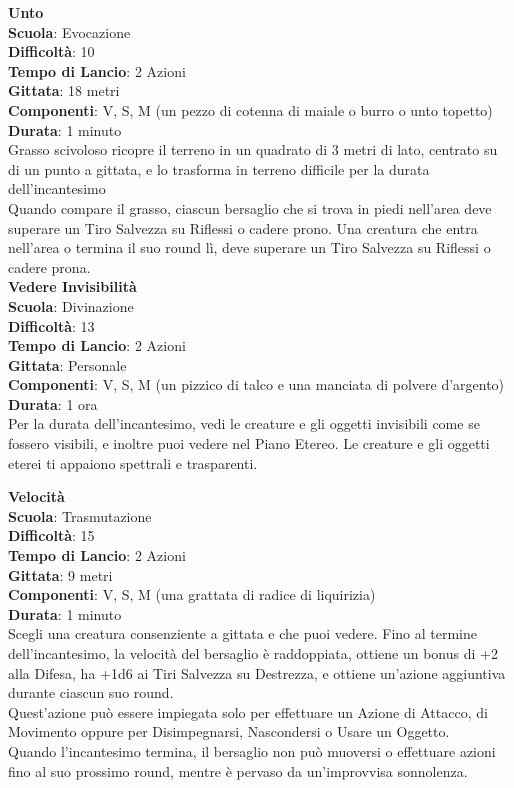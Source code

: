 \begin{multicols}{2}
\medskip\textbf{Unto}\\
\textbf{Scuola}: Evocazione\\
\textbf{Difficoltà}:  10\\
\textbf{Tempo di Lancio}: 2 Azioni\\
\textbf{Gittata}: 18 metri\\
\textbf{Componenti}: V, S, M (un pezzo di cotenna di maiale o burro o unto topetto)\\
\textbf{Durata}: 1 minuto\\
Grasso scivoloso ricopre il terreno in un quadrato di 3 metri di lato, centrato su di un punto a gittata, e lo trasforma in terreno difficile per la durata dell'incantesimo\\
Quando compare il grasso, ciascun bersaglio che si trova in piedi nell'area deve superare un Tiro Salvezza su Riflessi o cadere prono. Una creatura che entra nell'area o termina il suo round lì, deve superare un Tiro Salvezza su Riflessi o cadere prona.\\

\medskip\textbf{Vedere Invisibilità}\\
\textbf{Scuola}: Divinazione\\
\textbf{Difficoltà}:  13\\
\textbf{Tempo di Lancio}: 2 Azioni\\
\textbf{Gittata}: Personale\\
\textbf{Componenti}: V, S, M (un pizzico di talco e una manciata di polvere d'argento)\\
\textbf{Durata}: 1 ora\\
Per la durata dell'incantesimo, vedi le creature e gli oggetti invisibili come se fossero visibili, e inoltre puoi vedere nel Piano Etereo. Le creature e gli oggetti eterei ti appaiono spettrali e trasparenti.

\medskip\textbf{Velocità}\\
\textbf{Scuola}: Trasmutazione\\
\textbf{Difficoltà}:  15\\
\textbf{Tempo di Lancio}: 2 Azioni\\
\textbf{Gittata}: 9 metri\\
\textbf{Componenti}: V, S, M (una grattata di radice di liquirizia)\\
\textbf{Durata}: 1 minuto\\
Scegli una creatura consenziente a gittata e che puoi vedere. Fino al termine dell'incantesimo, la velocità del bersaglio è raddoppiata, ottiene un bonus di +2 alla Difesa, ha +1d6 ai Tiri Salvezza su Destrezza, e ottiene un'azione aggiuntiva durante ciascun suo round.\\
Quest'azione può essere impiegata solo per effettuare un Azione di Attacco, di Movimento oppure per Disimpegnarsi, Nascondersi o Usare un Oggetto.\\
Quando l'incantesimo termina, il bersaglio non può muoversi o effettuare azioni fino al suo prossimo round, mentre è pervaso da un'improvvisa sonnolenza.


\end{multicols}

